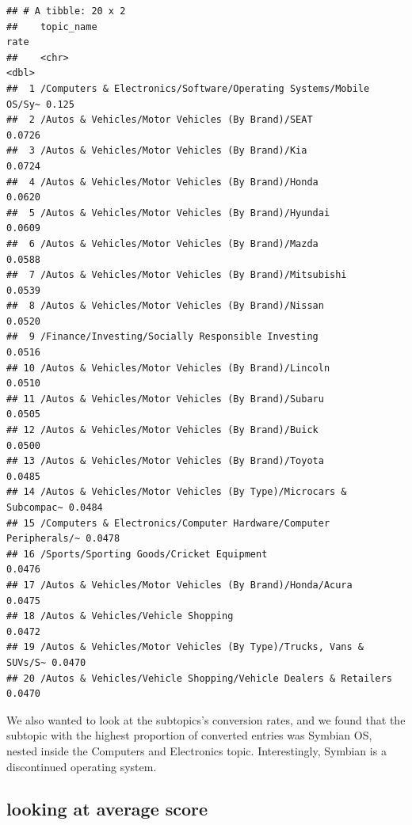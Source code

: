 \documentclass[]{article}
\begin{document}
\begin{verbatim}
## # A tibble: 20 x 2
##    topic_name                                                          rate
##    <chr>                                                              <dbl>
##  1 /Computers & Electronics/Software/Operating Systems/Mobile OS/Sy~ 0.125 
##  2 /Autos & Vehicles/Motor Vehicles (By Brand)/SEAT                  0.0726
##  3 /Autos & Vehicles/Motor Vehicles (By Brand)/Kia                   0.0724
##  4 /Autos & Vehicles/Motor Vehicles (By Brand)/Honda                 0.0620
##  5 /Autos & Vehicles/Motor Vehicles (By Brand)/Hyundai               0.0609
##  6 /Autos & Vehicles/Motor Vehicles (By Brand)/Mazda                 0.0588
##  7 /Autos & Vehicles/Motor Vehicles (By Brand)/Mitsubishi            0.0539
##  8 /Autos & Vehicles/Motor Vehicles (By Brand)/Nissan                0.0520
##  9 /Finance/Investing/Socially Responsible Investing                 0.0516
## 10 /Autos & Vehicles/Motor Vehicles (By Brand)/Lincoln               0.0510
## 11 /Autos & Vehicles/Motor Vehicles (By Brand)/Subaru                0.0505
## 12 /Autos & Vehicles/Motor Vehicles (By Brand)/Buick                 0.0500
## 13 /Autos & Vehicles/Motor Vehicles (By Brand)/Toyota                0.0485
## 14 /Autos & Vehicles/Motor Vehicles (By Type)/Microcars & Subcompac~ 0.0484
## 15 /Computers & Electronics/Computer Hardware/Computer Peripherals/~ 0.0478
## 16 /Sports/Sporting Goods/Cricket Equipment                          0.0476
## 17 /Autos & Vehicles/Motor Vehicles (By Brand)/Honda/Acura           0.0475
## 18 /Autos & Vehicles/Vehicle Shopping                                0.0472
## 19 /Autos & Vehicles/Motor Vehicles (By Type)/Trucks, Vans & SUVs/S~ 0.0470
## 20 /Autos & Vehicles/Vehicle Shopping/Vehicle Dealers & Retailers    0.0470
\end{verbatim}

We also wanted to look at the subtopics's conversion rates, and we found
that the subtopic with the highest proportion of converted entries was
Symbian OS, nested inside the Computers and Electronics topic.
Interestingly, Symbian is a discontinued operating system.

\hypertarget{looking-at-average-score}{%
\subsection{looking at average score}\label{looking-at-average-score}}
\end{document}
